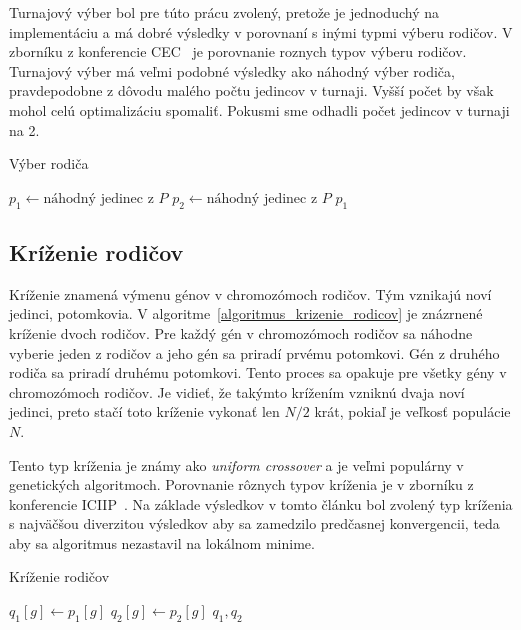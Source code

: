 Turnajový výber bol pre túto prácu zvolený, pretože je jednoduchý na implementáciu a má dobré výsledky v porovnaní s inými typmi výberu rodičov.
V zborníku z konferencie CEC~\cite{farias2018parent} je porovnanie roznych typov výberu rodičov.
Turnajový výber má veľmi podobné výsledky ako náhodný výber rodiča, pravdepodobne z dôvodu malého počtu jedincov v turnaji.
Vyšší počet by však mohol celú optimalizáciu spomaliť.
Pokusmi sme odhadli počet jedincov v turnaji na 2.

\vspace*{\dimexpr0.5\baselineskip\relax}
\begin{algorithm}[h]\label{algoritmus_vyber_rodica}
\caption{Výber rodiča}
  $p_1 \gets \text{náhodný jedinec z } P$\;
  $p_2 \gets \text{náhodný jedinec z } P$\;
   {
    \Return $p_1$\;
  }
\end{algorithm}

\subsection*{Kríženie rodičov}
Kríženie znamená výmenu génov v chromozómoch rodičov.
Tým vznikajú noví jedinci, potomkovia.
V algoritme~\ref{algoritmus_krizenie_rodicov} je znázrnené kríženie dvoch rodičov.
Pre každý gén v chromozómoch rodičov sa náhodne vyberie jeden z rodičov a jeho gén sa priradí prvému potomkovi.
Gén z druhého rodiča sa priradí druhému potomkovi.
Tento proces sa opakuje pre všetky gény v chromozómoch rodičov.
Je vidieť, že takýmto krížením vzniknú dvaja noví jedinci, preto stačí toto kríženie vykonať len $N/2$ krát, pokiaľ je veľkosť populácie $N$.

Tento typ kríženia je známy ako \textit{uniform crossover} a je veľmi populárny v genetických algoritmoch.
Porovnanie rôznych typov kríženia je v zborníku z konferencie ICIIP~\cite{bala2015comparative}.
Na základe výsledkov v tomto článku bol zvolený typ kríženia s najväčšou diverzitou výsledkov aby sa zamedzilo predčasnej konvergencii, teda aby sa algoritmus nezastavil na lokálnom minime.

\vspace*{\dimexpr0.5\baselineskip\relax}
\begin{algorithm}[h]\label{algoritmus_krizenie_rodicov}
\caption{Kríženie rodičov}
   {
     {
      $q_1[g] \gets p_1[g]$\;
      $q_2[g] \gets p_2[g]$\;
    }
  }
  \Return $q_1, q_2$\;
\end{algorithm}

